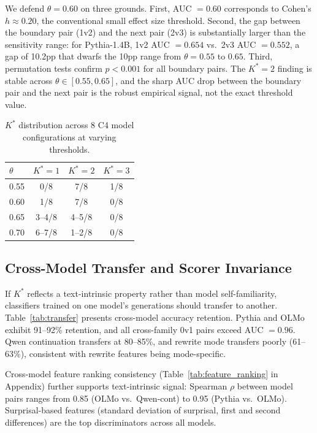 \documentclass[11pt]{article}
\begin{document}
We defend $\theta = 0.60$ on three grounds. First, AUC $= 0.60$ corresponds to Cohen's $h \approx 0.20$, the conventional small effect size threshold. Second, the gap between the boundary pair (1v2) and the next pair (2v3) is substantially larger than the sensitivity range: for Pythia-1.4B, 1v2 AUC $= 0.654$ vs.\ 2v3 AUC $= 0.552$, a gap of 10.2pp that dwarfs the 10pp range from $\theta = 0.55$ to $0.65$. Third, permutation tests confirm $p < 0.001$ for all boundary pairs. The $K^* = 2$ finding is stable across $\theta \in [0.55, 0.65]$, and the sharp AUC drop between the boundary pair and the next pair is the robust empirical signal, not the exact threshold value.

\begin{table}[t]
\centering
\caption{$K^*$ distribution across 8 C4 model configurations at varying thresholds.}
\label{tab:theta}
\small
\begin{tabular}{lccc}
\toprule
$\theta$ & $K^*{=}1$ & $K^*{=}2$ & $K^*{=}3$ \\
\midrule
0.55 & 0/8 & 7/8 & 1/8 \\
0.60 & 1/8 & 7/8 & 0/8 \\
0.65 & 3--4/8 & 4--5/8 & 0/8 \\
0.70 & 6--7/8 & 1--2/8 & 0/8 \\
\bottomrule
\end{tabular}
\end{table}

\subsection{Cross-Model Transfer and Scorer Invariance}
\label{sec:scorer}

If $K^*$ reflects a text-intrinsic property rather than model self-familiarity, classifiers trained on one model's generations should transfer to another. Table~\ref{tab:transfer} presents cross-model accuracy retention. Pythia and OLMo exhibit 91--92\% retention, and all cross-family 0v1 pairs exceed AUC $= 0.96$. Qwen continuation transfers at 80--85\%, and rewrite mode transfers poorly (61--63\%), consistent with rewrite features being mode-specific.

Cross-model feature ranking consistency (Table~\ref{tab:feature_ranking} in Appendix) further supports text-intrinsic signal: Spearman $\rho$ between model pairs ranges from 0.85 (OLMo vs.\ Qwen-cont) to 0.95 (Pythia vs.\ OLMo). Surprisal-based features (standard deviation of surprisal, first and second differences) are the top discriminators across all models.
\end{document}
